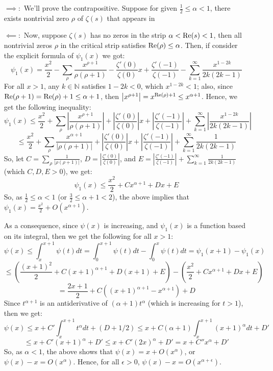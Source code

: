 \documentclass{article}
\begin{document}
\begin{itemize}
    \item[$\implies:$] We'll prove the contrapositive. Suppose for given $\frac{1}{2}\leq \alpha<1$, there exists nontrivial zero $\rho$ of $\zeta(s)$ that appears in 
    
    \hfil

    \item[$\impliedby:$] Now, suppose $\zeta(s)$ has no zeros in the strip $\alpha<\textmd{Re}(s)<1$, then all nontrivial zeros $\rho$ in the critical strip satisfies $\textmd{Re}(\rho)\leq \alpha$. Then, if consider the explicit formula of $\psi_1(x)$ we got:
    $$\psi_1(x)=\frac{x^2}{2}-\sum_{\rho}\frac{x^{\rho+1}}{\rho(\rho+1)}-\frac{\zeta'(0)}{\zeta(0)}x+\frac{\zeta'(-1)}{\zeta(-1)}-\sum_{k=1}^{\infty}\frac{x^{1-2k}}{2k(2k-1)}$$
    For all $x>1$, any $k\in\mathbb{N}$ satisfies $1-2k<0$, which $x^{1-2k}<1$; also, since $\textmd{Re}(\rho+1)=\textmd{Re}(\rho)+1 \leq \alpha+1$, then $\left|x^{\rho+1}\right| = x^{\textmd{Re}(\rho)+1} \leq x^{\alpha+1}$. Hence, we get the following inequality:
    $$\psi_1(x) \leq \frac{x^2}{2}+\sum_{\rho}\left|\frac{x^{\rho+1}}{\rho(\rho+1)}\right| + \left|\frac{\zeta'(0)}{\zeta(0)}\right|x + \left|\frac{\zeta'(-1)}{\zeta(-1)}\right| + \sum_{k=1}^{\infty}\left|\frac{x^{1-2k}}{2k(2k-1)}\right|$$
    $$ \leq \frac{x^2}{2}+\sum_{\rho}\frac{x^{\alpha+1}}{|\rho(\rho+1)|}+\left|\frac{\zeta'(0)}{\zeta(0)}\right|x + \left|\frac{\zeta'(-1)}{\zeta(-1)}\right| + \sum_{k=1}^{\infty}\frac{1}{2k(2k-1)}$$
    So, let $C = \sum_{\rho}\frac{1}{|\rho(\rho+1)|}$, $D=\left|\frac{\zeta'(0)}{\zeta(0)}\right|$, and $E = \left|\frac{\zeta'(-1)}{\zeta(-1)}\right| + \sum_{k=1}^{\infty}\frac{1}{2k(2k-1)}$ (which $C,D,E> 0$), we get:
    $$\psi_1(x) \leq \frac{x^2}{2}+Cx^{\alpha+1}+Dx + E$$
    So, as $\frac{1}{2}\leq \alpha <1$ (or $\frac{3}{2}\leq \alpha+1<2$), the above implies that $\psi_1(x)=\frac{x^2}{2} +O(x^{\alpha+1})$.

    As a consequence, since $\psi(x)$ is increasing, and $\psi_1(x)$ is a function based on its integral, then we get the following for all $x>1$:
    $$\psi(x)\leq \int_{x}^{x+1}\psi(t)dt = \int_{0}^{x+1}\psi(t)dt - \int_{0}^{x}\psi(t)dt = \psi_1(x+1)-\psi_1(x)$$
    $$\leq \left(\frac{(x+1)^2}{2}+C(x+1)^{\alpha+1}+D(x+1)+E\right)-\left(\frac{x^2}{2}+Cx^{\alpha+1}+Dx+E\right)$$
    $$ = \frac{2x+1}{2} + C\left((x+1)^{\alpha+1}-x^{\alpha+1}\right) + D$$
    Since $t^{\alpha+1}$ is an antiderivative of $(\alpha+1)t^{\alpha}$ (which is increasing for $t>1$), then we get:
    $$\psi(x)\leq x + C'\int_{x}^{x+1}t^{\alpha}dt + (D+1/2) \leq x+C(\alpha+1)\int_{x}^{x+1}(x+1)^{\alpha}dt + D'$$
    $$\leq x + C'(x+1)^\alpha + D' \leq x+C'(2x)^\alpha + D' = x+C''x^\alpha + D'$$
    So, as $\alpha<1$, the above shows that $\psi(x) = x+O(x^{\alpha})$, or $\psi(x)-x=O(x^{\alpha})$. Hence, for all $\epsilon>0$, $\psi(x)-x = O(x^{\alpha+\epsilon})$.
\end{itemize}
\end{document}
